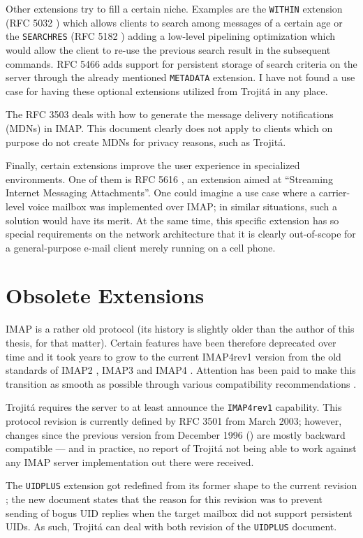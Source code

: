 \documentclass[trojita]{subfiles}
\begin{document}
Other extensions try to fill a certain niche.  Examples are the {\tt WITHIN} extension (RFC 5032 \cite{rfc5032}) which
allows clients to search among messages of a certain age or the {\tt SEARCHRES} (RFC 5182 \cite{rfc5182}) adding a
low-level pipelining optimization which would allow the client to re-use the previous search result in the subsequent
commands.  RFC 5466 \cite{rfc5466} adds support for persistent storage of search criteria on the server through the
already mentioned {\tt METADATA} extension.  I have not found a use case for having these optional extensions utilized
from Trojitá in any place.

The RFC 3503 \cite{rfc3503} deals with how to generate the message delivery notifications (MDNs) in IMAP.  This document
clearly does not apply to clients which on purpose do not create MDNs for privacy reasons, such as Trojitá.

Finally, certain extensions improve the user experience in specialized environments.  One of them is RFC 5616
\cite{rfc5616}, an extension aimed at ``Streaming Internet Messaging Attachments''.  One could imagine a use case where
a carrier-level voice mailbox was implemented over IMAP; in similar situations, such a solution would have its merit.
At the same time, this specific extension has so special requirements on the network architecture that it is clearly
out-of-scope for a general-purpose e-mail client merely running on a cell phone.

\section{Obsolete Extensions}

IMAP is a rather old protocol (its history is slightly older than the author of this thesis, for that matter).  Certain
features have been therefore deprecated over time and it took years to grow to the current IMAP4rev1 version from the
old standards of IMAP2 \cite{rfc1064} \cite{rfc1176}, IMAP3 \cite{rfc1203} and IMAP4 \cite{rfc1730}.  Attention has been
paid to make this transition as smooth as possible through various compatibility recommendations \cite{rfc1732}
\cite{rfc2060} \cite{rfc2061} \cite{rfc2062}.

Trojitá requires the server to at least announce the {\tt IMAP4rev1} capability.  This protocol revision is currently
defined by RFC 3501 \cite{rfc3501} from March 2003; however, changes since the previous version from December 1996
(\cite{rfc2060}) are mostly backward compatible --- and in practice, no report of Trojitá not being able to work against
any IMAP server implementation out there were received.

The {\tt UIDPLUS} extension got redefined from its former shape \cite{rfc2359} to the current revision \cite{rfc4315};
the new document states that the reason for this revision was to prevent sending of bogus UID replies when the target
mailbox did not support persistent UIDs.  As such, Trojitá can deal with both revision of the {\tt UIDPLUS} document.
\end{document}
